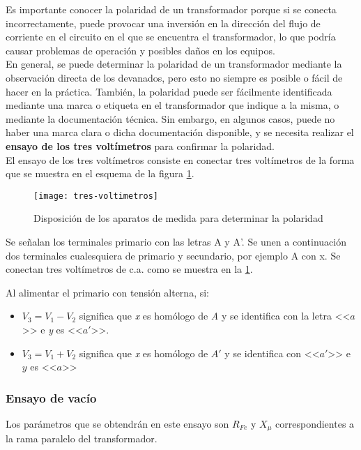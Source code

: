 Es importante conocer la polaridad de un transformador porque si se conecta incorrectamente, puede provocar una inversión en la dirección del flujo de corriente en el circuito en el que se encuentra el transformador, lo que podría causar problemas de operación y posibles daños en los equipos.\\

En general, se puede determinar la polaridad de un transformador mediante la observación directa de los devanados, pero esto no siempre es posible o fácil de hacer en la práctica. También, la polaridad puede ser fácilmente identificada mediante una marca o etiqueta en el transformador que indique a la misma, o mediante la documentación técnica. Sin embargo, en algunos casos, puede no haber una marca clara o dicha documentación disponible, y se necesita realizar el \textbf{ensayo de los tres voltímetros} para confirmar la polaridad.\\


El ensayo de los tres voltímetros consiste en conectar tres voltímetros de la forma que se muestra en el esquema de la figura \ref{fig:ensayo3voltimetros}.


\begin{figure}[H]
	\centering
	\texttt{[image: tres-voltimetros]}
	\caption{Disposición de los aparatos de medida para determinar la polaridad}
	\label{fig:ensayo3voltimetros}
\end{figure}
Se señalan los terminales primario con las letras A y A'. Se unen a continuación dos terminales cualesquiera de primario y secundario, por ejemplo A con x. Se conectan tres voltímetros de c.a. como se muestra en la \ref{fig:ensayo3voltimetros}. 


Al alimentar el primario con tensión alterna, si:
\begin{itemize}
	\item $V_{3}=V_{1}-V_{2}$ significa que \textit{x} es homólogo de \textit{A} y se identifica con la letra <<$a$>> e \textit{y} es <<$a'$>>.
	\item $V_{3}=V_{1}+V_{2}$ significa que \textit{x} es homólogo de \textit{$A'$} y se identifica con <<$a'$>> e $y$ es <<$a$>>
\end{itemize}

\subsubsection{Ensayo de vacío}

Los parámetros que se obtendrán en este ensayo son $R_{Fe}$ y $X_\mu$ correspondientes a la rama paralelo del transformador.\\


